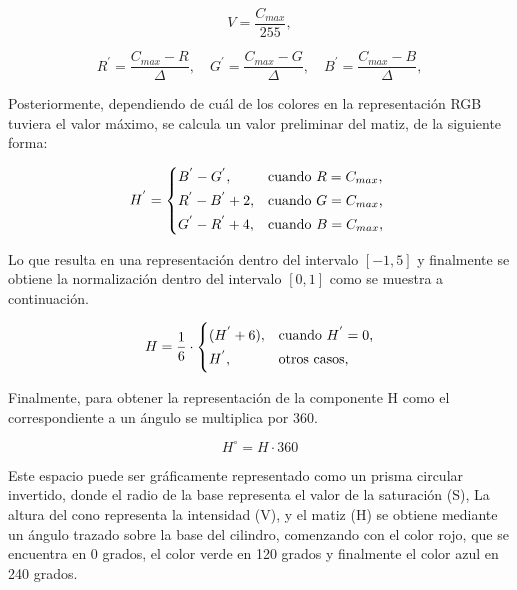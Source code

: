 \begin{equation}
V = \frac{C_{max}}{255},
\end{equation}

\begin{equation*}
R^{'} = \frac{C_{max}-R}{\Delta},  \quad G^{'} = \frac{C_{max}-G}{\Delta},  \quad B^{'} = \frac{C_{max}-B}{\Delta},
\end{equation*}

Posteriormente, dependiendo de cuál de los colores en la representación RGB tuviera el valor máximo, se calcula un valor preliminar del matiz, de la siguiente forma:

\begin{equation*}
    H^{'} = \begin{cases*}
  B^{'} - G^{'}, & cuando $R = C_{max}$,\\
  R^{'} - B^{'}+2, & cuando $G = C_{max}$,\\
  G^{'} - R^{'}+4, & cuando $B = C_{max}$,
    \end{cases*}
\end{equation*}

Lo que resulta en una representación dentro del intervalo $[-1,5]$ y finalmente se obtiene la normalización dentro del intervalo $[0,1]$ como se muestra a continuación.

\begin{equation*}
    H = \frac{1}{6}\cdot\begin{cases*}
  (H^{'}+6), & cuando $H^{'}=0$,\\
  H^{'}, & otros casos,
    \end{cases*}
\end{equation*}

Finalmente, para obtener la representación de la componente H como el correspondiente a un ángulo se multiplica por 360.

\begin{equation*}
    H^{\circ} = H\cdot360
\end{equation*}

Este espacio puede ser gráficamente representado como un prisma circular invertido, donde el radio de la base representa el valor de la saturación (S), La altura del cono representa la intensidad (V), y el matiz (H) se obtiene mediante un ángulo trazado sobre la base del cilindro, comenzando con el color rojo, que se encuentra en 0 grados, el color verde en 120 grados y finalmente el color azul en 240 grados. 

